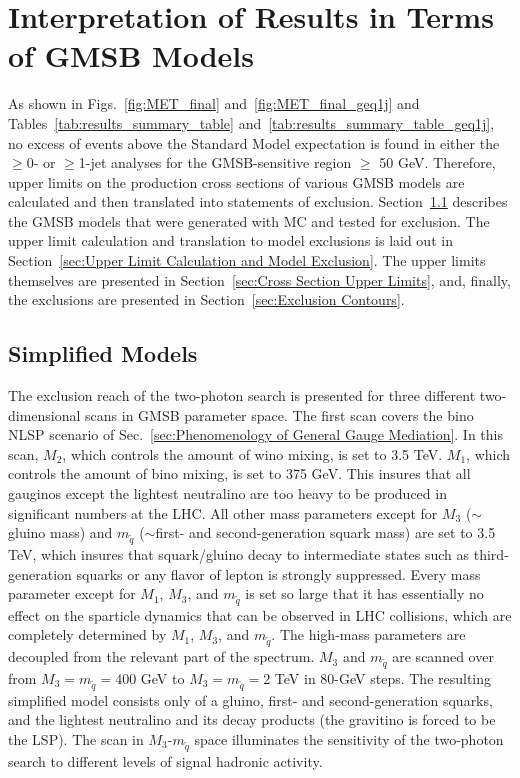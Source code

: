 \documentclass[dissertation.tex]{subfiles}
\begin{document}
\chapter{Interpretation of Results in Terms of GMSB Models}
\label{chap:Interpretation of Results in Terms of GMSB Models}

As shown in Figs.~\ref{fig:MET_final} and~\ref{fig:MET_final_geq1j} and Tables~\ref{tab:results_summary_table} and~\ref{tab:results_summary_table_geq1j}, no excess of events above the Standard Model expectation is found in either the $\geq$0- or $\geq$1-jet analyses for the GMSB-sensitive region \MET $\geq$ 50 GeV.  Therefore, upper limits on the production cross sections of various GMSB models are calculated and then translated into statements of exclusion.  Section~\ref{sec:Simplified Models} describes the GMSB models that were generated with MC and tested for exclusion.  The upper limit calculation and translation to model exclusions is laid out in Section~\ref{sec:Upper Limit Calculation and Model Exclusion}.  The upper limits themselves are presented in Section~\ref{sec:Cross Section Upper Limits}, and, finally, the exclusions are presented in Section~\ref{sec:Exclusion Contours}.

\section{Simplified Models}
\label{sec:Simplified Models}

The exclusion reach of the two-photon search is presented for three different two-dimensional scans in GMSB parameter space.  The first scan covers the bino NLSP scenario of Sec.~\ref{sec:Phenomenology of General Gauge Mediation}.  In this scan, $M_{2}$, which controls the amount of wino mixing, is set to 3.5 TeV.  $M_{1}$, which controls the amount of bino mixing, is set to 375 GeV.  This insures that all gauginos except the lightest neutralino are too heavy to be produced in significant numbers at the LHC.  All other mass parameters except for $M_{3}$ ($\sim$gluino mass) and $m_{\tilde{q}}$ ($\sim$first- and second-generation squark mass) are set to 3.5 TeV, which insures that squark/gluino decay to intermediate states such as third-generation squarks or any flavor of lepton is strongly suppressed.  Every mass parameter except for $M_{1}$, $M_{3}$, and $m_{\tilde{q}}$ is set so large that it has essentially no effect on the sparticle dynamics that can be observed in LHC collisions, which are completely determined by $M_{1}$, $M_{3}$, and $m_{\tilde{q}}$.  The high-mass parameters are decoupled from the relevant part of the spectrum.  $M_{3}$ and $m_{\tilde{q}}$ are scanned over from $M_{3} = m_{\tilde{q}} = 400$ GeV to $M_{3} = m_{\tilde{q}} = 2$ TeV in 80-GeV steps.  The resulting simplified model consists only of a gluino, first- and second-generation squarks, and the lightest neutralino and its decay products (the gravitino is forced to be the LSP).  The scan in $M_{3}$-$m_{\tilde{q}}$ space illuminates the sensitivity of the two-photon search to different levels of signal hadronic activity.
\end{document}
